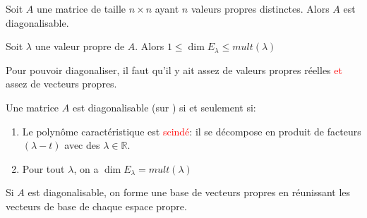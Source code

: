     \begin{theoreme}
        Soit $A$ une matrice de taille $n \times n$ ayant $n$ valeurs propres distinctes. Alors $A$ est diagonalisable.
    \end{theoreme}
    \begin{theoreme}
        Soit $\lambda$ une valeur propre de $A$. Alors $1 \leq \dim E_\lambda \leq mult(\lambda)$
    \end{theoreme}
    Pour pouvoir diagonaliser, il faut qu'il y ait assez de valeurs propres réelles \textcolor{red}{et} assez de vecteurs propres.
    \begin{theoreme}
        Une matrice $A$ est diagonalisable (sur \R) si et seulement si:
        \begin{enumerate}
            \item Le polynôme caractéristique est \textcolor{red}{scindé}: il se décompose en produit de facteurs $(\lambda - t)$ avec des $\lambda \in \mathbb{R}$.
            \item Pour tout $\lambda$, on a $\dim E_\lambda = mult(\lambda)$
        \end{enumerate}
        Si $A$ est diagonalisable, on forme une base de vecteurs propres en réunissant les vecteurs de base de chaque espace propre.
    \end{theoreme}
